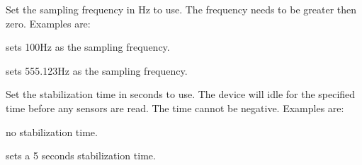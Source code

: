 \label{par:crbsnoise_sampling_frequency}

Set the sampling frequency in Hz to use. The frequency needs to be greater then zero.
Examples are:
\begin{compactitem}
\item {} sets 100Hz as the sampling frequency.
\item {} sets 555.123Hz as the sampling frequency.
\end{compactitem}

\label{par:crbsnoise_stabilization_time}

Set the stabilization time in seconds to use. The device will idle for the
specified time before any sensors are read. The time cannot be negative.
Examples are:
\begin{compactitem}
\item {} no stabilization time.
\item {} sets a 5 seconds stabilization time.
\end{compactitem}

